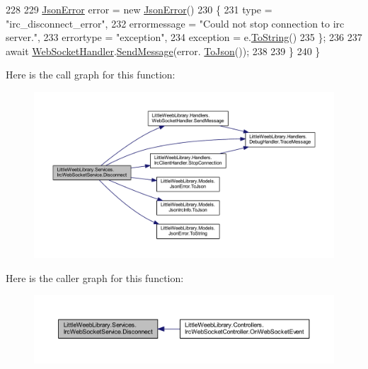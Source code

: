 \begin{DoxyCode}
228 
229                 \mbox{\hyperlink{class_little_weeb_library_1_1_models_1_1_json_error}{JsonError}} error = \textcolor{keyword}{new} \mbox{\hyperlink{class_little_weeb_library_1_1_models_1_1_json_error}{JsonError}}()
230                 \{
231                     type = \textcolor{stringliteral}{"irc\_disconnect\_error"},
232                     errormessage = \textcolor{stringliteral}{"Could not stop connection to irc server."},
233                     errortype = \textcolor{stringliteral}{"exception"},
234                     exception = e.\mbox{\hyperlink{class_little_weeb_library_1_1_models_1_1_json_error_ad7d5522c90119111d2e929f39e7f6d3c}{ToString}}()
235                 \};
236 
237                 await \mbox{\hyperlink{class_little_weeb_library_1_1_handlers_1_1_web_socket_handler}{WebSocketHandler}}.\mbox{\hyperlink{class_little_weeb_library_1_1_handlers_1_1_web_socket_handler_a1de289d54d665a32c93478c68d3e6ad0}{SendMessage}}(error.
      \mbox{\hyperlink{class_little_weeb_library_1_1_models_1_1_json_error_a0e3e7dd2e2990404b7f0461742b23440}{ToJson}}());
238 
239             \}
240         \}        
\end{DoxyCode}
Here is the call graph for this function\+:\nopagebreak
\begin{figure}[H]
\begin{center}
\leavevmode
\includegraphics[width=350pt]{class_little_weeb_library_1_1_services_1_1_irc_web_socket_service_a637703e827e16a5d99055119bfe62972_cgraph}
\end{center}
\end{figure}
Here is the caller graph for this function\+:\nopagebreak
\begin{figure}[H]
\begin{center}
\leavevmode
\includegraphics[width=350pt]{class_little_weeb_library_1_1_services_1_1_irc_web_socket_service_a637703e827e16a5d99055119bfe62972_icgraph}
\end{center}
\end{figure}
